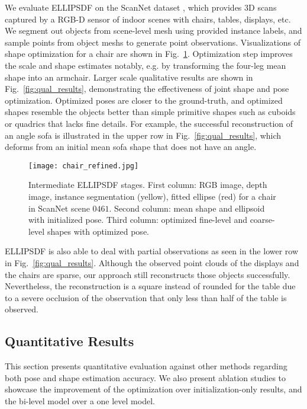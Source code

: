 We evaluate ELLIPSDF on the ScanNet dataset \cite{dai2017scannet}, which provides 3D scans captured by a RGB-D sensor of indoor scenes with chairs, tables, displays, etc. We segment out objects from scene-level mesh using provided instance labels, and sample points from object meshs to generate point observations. 
Visualizations of shape optimization for a chair are shown in Fig.~\ref{fig:fig1_refined}. Optimization step improves the scale and shape estimates notably, e.g. by transforming the four-leg mean shape into an armchair. 
Larger scale qualitative results are shown in Fig.~\ref{fig:qual_results}, demonstrating the effectiveness of joint shape and pose optimization. Optimized poses are closer to the ground-truth, and optimized shapes resemble the objects better than simple primitive shapes such as cuboids or quadrics that lacks fine details. 
For example, the successful reconstruction of an angle sofa is illustrated in the upper row in Fig.~\ref{fig:qual_results}, which deforms from an initial mean sofa shape that does not have an angle. 
\begin{figure}[t]
    \centering
    \texttt{[image: chair\_refined.jpg]}
    \caption{Intermediate ELLIPSDF stages. First column: RGB image, depth image, instance segmentation (yellow), fitted ellipse (red) for a chair in ScanNet scene $0461$. Second column: mean shape and ellipsoid with initialized pose. Third column: optimized fine-level and coarse-level shapes with optimized pose.}
    \label{fig:fig1_refined}
\end{figure}
ELLIPSDF is also able to deal with partial observations as seen in the lower row in Fig.~\ref{fig:qual_results}. Although the observed point clouds of the displays and the chairs are sparse, our approach still reconstructs those objects successfully. Nevertheless, the reconstruction is a square instead of rounded for the table due to a severe occlusion of the observation that only less than half of the table is observed. 

\subsection{Quantitative Results}

This section presents quantitative evaluation against other methods regarding both pose and shape estimation accuracy. We also present ablation studies to showcase the improvement of the optimization over initialization-only results, and the bi-level model over a one level model. 

